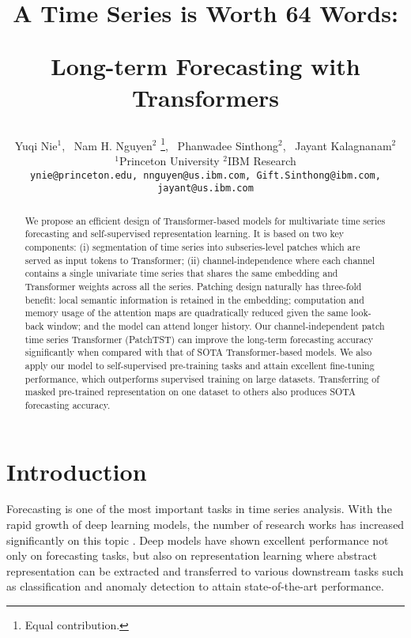 \documentclass{article} \usepackage{iclr2023_conference,times}
\title{
A Time Series is Worth 64 Words:

Long-term Forecasting with Transformers









}
\author{Yuqi Nie$^{1}$\footnotemark[1], \ Nam H. Nguyen$^{2}$ \thanks{Equal contribution.}, \ Phanwadee Sinthong$^{2}$, \ Jayant Kalagnanam$^{2}$ \\
$^{1}$Princeton University $^{2}$IBM Research\\
\texttt{ynie@princeton.edu, nnguyen@us.ibm.com, Gift.Sinthong@ibm.com,} \\
\texttt{jayant@us.ibm.com} \\
}
\begin{document}
\maketitle

\begin{abstract}





We propose an efficient design of Transformer-based models for multivariate time series forecasting and self-supervised representation learning. It is based on two key components: (i) segmentation of time series into subseries-level patches which are served as input tokens to Transformer; (ii) channel-independence where each channel contains a single univariate time series that shares the same embedding and Transformer weights across all the series. Patching design naturally has three-fold benefit: local semantic information is retained in the embedding; computation and memory usage of the attention maps are quadratically reduced given the same look-back window; and the model can attend longer history. Our channel-independent patch time series Transformer (PatchTST) can improve the long-term forecasting accuracy significantly when compared with that of SOTA Transformer-based models. We also apply our model to self-supervised pre-training tasks and attain excellent fine-tuning performance, which outperforms supervised training on large datasets. Transferring of masked pre-trained representation on one dataset to others also produces SOTA forecasting accuracy.



\end{abstract}

\section{Introduction}

Forecasting is one of the most important tasks in time series analysis. With the rapid growth of deep learning models, the number of research works has increased significantly on this topic \citep{survey1,survey2,survey3}. Deep models have shown excellent performance not only on forecasting tasks, but also on representation learning where abstract representation can be extracted and transferred to various downstream tasks such as classification and anomaly detection to attain state-of-the-art performance.
\end{document}
